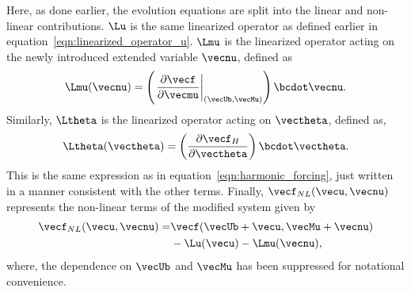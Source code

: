 Here, as done earlier, the evolution equations are split into the linear and non-linear contributions. $\Lu$ is the same linearized operator as defined earlier in equation~\ref{eqn:linearized_operator_u}. $\Lmu$ is the linearized operator acting on the newly introduced extended variable $\vecnu$, defined as
\begin{equation}
	\Lmu(\vecnu) = \left(\left.\frac{\partial \vecf}{\partial \vecmu}\right|_{(\vecUb,\vecMu)} \right)\bcdot \vecnu.
	\label{eqn:linearized_operator_mu}
\end{equation}
Similarly, $\Ltheta$ is the linearized operator acting on $\vectheta$, defined as,
\begin{equation}
	\Ltheta(\vectheta) = \left(\frac{\partial \vecf_{H}}{\partial \vectheta} \right)\bcdot \vectheta.
	\label{eqn:linearized_operator_theta}
\end{equation}
This is the same expression as in equation~\eqref{eqn:harmonic_forcing}, just written in a manner consistent with the other terms. Finally, $\vecf_{NL}(\vecu,\vecnu)$ represents the non-linear terms of the modified system given by
\begin{equation}
	\begin{split}
		\vecf_{NL}(\vecu,\vecnu) =& \vecf(\vecUb + \vecu,\vecMu + \vecnu) \\
		& - \Lu(\vecu) - \Lmu(\vecnu),
	\end{split}
	\label{eqn:nonlinear_term}
\end{equation}
where, the dependence on $\vecUb$ and $\vecMu$ has been suppressed for notational convenience. 


